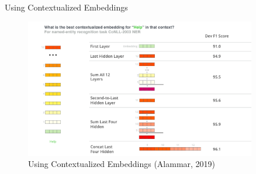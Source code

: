 \documentclass[10pt]{beamer}
\begin{document}
\begin{frame}{Using Contextualized Embeddings}

\begin{figure}[h]
\centering
\includegraphics[width=0.9\textwidth]{fig/bert-feature-extraction-contextualized-embeddings.png}
\caption{Using Contextualized Embeddings (Alammar, 2019)}
\end{figure}

\end{frame}
\end{document}

